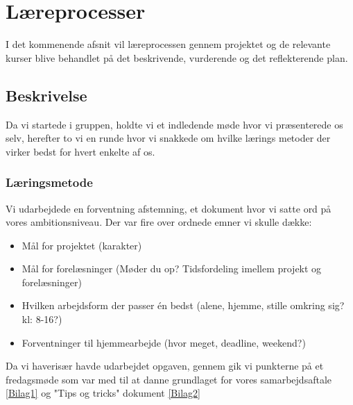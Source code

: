 \chapter{Læreprocesser}
I det kommenende afsnit vil læreprocessen gennem projektet og de relevante kurser blive behandlet på det beskrivende, vurderende og det reflekterende plan. 
\section{Beskrivelse}
Da vi startede i gruppen,  holdte vi et indledende møde hvor vi præsenterede os selv, herefter to vi en runde hvor vi snakkede om hvilke lærings metoder der virker bedst for hvert enkelte af os.
\subsection{Læringsmetode}
 Vi udarbejdede en  forventning afstemning, et dokument hvor vi satte ord på vores ambitionsniveau. Der var fire over ordnede emner vi skulle dække:

\begin{itemize}
	\item Mål for projektet (karakter)
	\item Mål for forelæsninger (Møder du op? Tidsfordeling imellem projekt og forelæsninger)
	\item Hvilken arbejdsform der passer én bedst (alene, hjemme, stille omkring sig? kl: 8-16?)
	\item Forventninger til hjemmearbejde (hvor meget, deadline, weekend?)
\end{itemize}
Da vi haverisær havde udarbejdet opgaven, gennem gik vi punkterne på et fredagsmøde som var med til at danne grundlaget for vores samarbejdsaftale \ref{Bilag1} og "Tips og tricks" dokument \ref{Bilag2}

